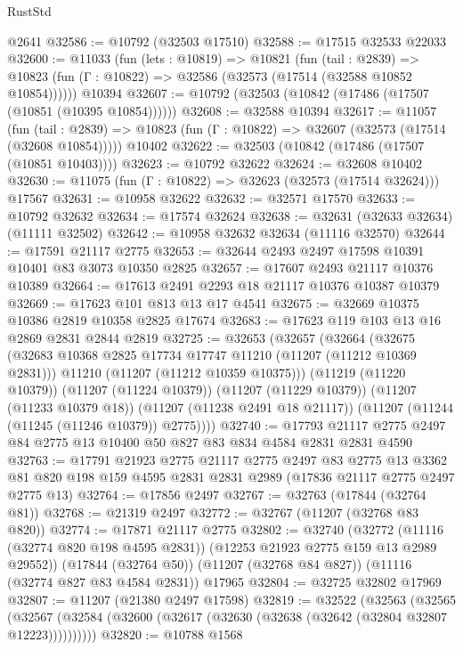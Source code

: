 \begin{lexlean}{RustStd}
\begin{coremodule}
    @2641
@32586 := @10792 (@32503 @17510)
@32588 := @17515 @32533 @22033
@32600 := @11033
    (fun (lets : @10819) =>
    @10821
      (fun (tail : @2839) =>
      @10823 (fun (Γ : @10822) => @32586 (@32573 (@17514 (@32588 @10852 @10854))))))
    @10394
@32607 := @10792 (@32503 (@10842 (@17486 (@17507 (@10851 (@10395 @10854))))))
@32608 := @32588 @10394
@32617 := @11057
    (fun (tail : @2839) => @10823 (fun (Γ : @10822) => @32607 (@32573 (@17514 (@32608 @10854)))))
    @10402
@32622 := @32503 (@10842 (@17486 (@17507 (@10851 @10403))))
@32623 := @10792 @32622
@32624 := @32608 @10402
@32630 := @11075 (fun (Γ : @10822) => @32623 (@32573 (@17514 @32624))) @17567
@32631 := @10958 @32622
@32632 := @32571 @17570
@32633 := @10792 @32632
@32634 := @17574 @32624
@32638 := @32631 (@32633 @32634) (@11111 @32502)
@32642 := @10958 @32632 @32634 (@11116 @32570)
@32644 := @17591 @21117 @2775
@32653 := @32644 @2493 @2497 @17598 @10391 @10401 @83 @3073 @10350 @2825
@32657 := @17607 @2493 @21117 @10376 @10389
@32664 := @17613 @2491 @2293 @18 @21117 @10376 @10387 @10379
@32669 := @17623 @101 @813 @13 @17 @4541
@32675 := @32669 @10375 @10386 @2819 @10358 @2825 @17674
@32683 := @17623 @119 @103 @13 @16 @2869 @2831 @2844 @2819
@32725 := @32653
    (@32657
      (@32664
        (@32675
          (@32683 @10368 @2825 @17734 @17747 @11210 (@11207 (@11212 @10369 @2831)))
          @11210
          (@11207 (@11212 @10359 @10375)))
        (@11219 (@11220 @10379))
        (@11207 (@11224 @10379))
        (@11207 (@11229 @10379))
        (@11207 (@11233 @10379 @18))
        (@11207 (@11238 @2491 @18 @21117))
        (@11207 (@11244 (@11245 (@11246 @10379)) @2775))))
@32740 := @17793 @21117 @2775 @2497 @84 @2775 @13 @10400 @50 @827 @83 @834 @4584 @2831 @2831 @4590
@32763 := @17791
    @21923
    @2775
    @21117
    @2775
    @2497
    @83
    @2775
    @13
    @3362
    @81
    @820
    @198
    @159
    @4595
    @2831
    @2831
    @2989
    (@17836 @21117 @2775 @2497 @2775 @13)
@32764 := @17856 @2497
@32767 := @32763 (@17844 (@32764 @81))
@32768 := @21319 @2497
@32772 := @32767 (@11207 (@32768 @83 @820))
@32774 := @17871 @21117 @2775
@32802 := @32740
    (@32772 (@11116 (@32774 @820 @198 @4595 @2831)) (@12253 @21923 @2775 @159 @13 @2989 @29552))
    (@17844 (@32764 @50))
    (@11207 (@32768 @84 @827))
    (@11116 (@32774 @827 @83 @4584 @2831))
    @17965
@32804 := @32725 @32802 @17969
@32807 := @11207 (@21380 @2497 @17598)
@32819 := @32522
    (@32563
      (@32565
        (@32567 (@32584 (@32600 (@32617 (@32630 (@32638 (@32642 (@32804 @32807 @12223))))))))))
@32820 := @10788 @1568

\end{coremodule}
\end{lexlean}
